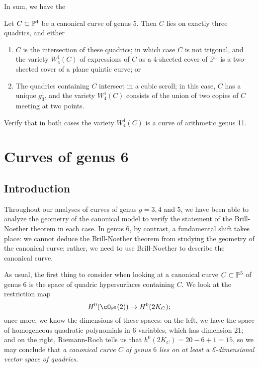 In sum, we have the

\begin{theorem}
Let $C \subset \PP^4$ be a canonical curve of genus 5. Then $C$ lies on exactly three quadrics, and either
\begin{enumerate}
\item $C$ is the intersection of these quadrics; in which case $C$ is not trigonal, and the variety $W^1_4(C)$ of expressions of $C$ as a 4-sheeted cover of $\PP^1$ is a two-sheeted cover of a plane quintic curve; or
\item The quadrics containing $C$ intersect in a cubic scroll; in this case, $C$ has a unique $g^1_3$, and the variety $W^1_4(C)$ consists of the union of two copies of $C$ meeting at two points.
\end{enumerate}
\end{theorem}

\begin{exercise}
Verify that in both cases the variety $W^1_4(C)$ is a curve of arithmetic genus 11.
\end{exercise}

\section{Curves of genus 6}

\subsection{Introduction}

Throughout our analyses of curves of genus $g = 3, 4$ and 5, we have been able to analyze the geometry of the canonical model to verify the statement of the Brill-Noether theorem in each case. In genus 6, by contrast, a fundamental shift takes place: we cannot deduce the Brill-Noether theorem from studying the geometry of the canonical curve; rather, we need to use Brill-Noether to describe the canonical curve.

As usual, the first thing to consider when looking at a canonical curve $C \subset \PP^5$ of genus 6 is the space of quadric hypersurfaces containing $C$. We look at the restriction map
$$
H^0(\cO_{\PP^5}(2)) \to H^0(2K_C);
$$
once more, we know the dimensions of these spaces: on the left, we have the space of homogeneous quadratic polynomials in 6 variables, which has dimension 21; and on the right, Riemann-Roch tells us that $h^0(2K_C) = 20 - 6 + 1 = 15$, so we may conclude that \emph{a canonical curve $C$ of genus $6$ lies on at least a 6-dimensional vector space of quadrics}.

